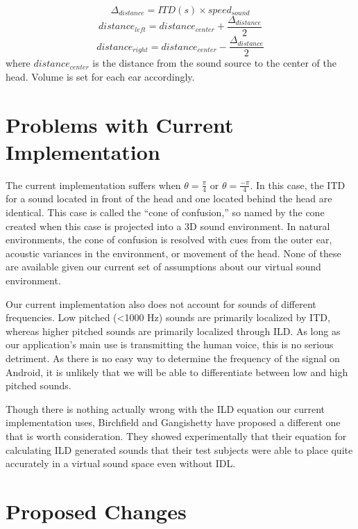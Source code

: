 \documentclass[12pt, letterpaper, draft]{article}
\begin{document}
\begin{equation}
\Delta_{distance} = ITD(s) \times speed_{sound}
\end{equation}
\begin{equation}
distance_{left} = distance_{center} + \frac{\Delta_{distance}}{2}
\end{equation}
\begin{equation}
distance_{right} = distance_{center} - \frac{\Delta_{distance}}{2}
\end{equation}
where $distance_{center}$ is the distance from the sound source to the
center of the head. Volume is set for each ear accordingly.

\section*{Problems with Current Implementation}

The current implementation suffers when $\theta = \frac{\pi}{4}$ or
$\theta = \frac{-\pi}{4}$. In this case, the ITD for a sound located
in front of the head and one located behind the head are identical.
This case is called the ``cone of confusion,'' so named by the cone
created when this case is projected into a 3D sound environment. In
natural environments, the cone of confusion is resolved with cues from
the outer ear, acoustic variances in the environment, or movement of
the head. None of these are available given our current set of
assumptions about our virtual sound environment. 

Our current implementation also does not account for sounds of
different frequencies. Low pitched (<1000 Hz) sounds are primarily
localized by ITD, whereas higher pitched sounds are primarily
localized through ILD. As long as our application's main use is
transmitting the human voice, this is no serious detriment. As there
is no easy way to determine the frequency of the signal on Android, it
is unlikely that we will be able to differentiate between low and high
pitched sounds.

Though there is nothing actually wrong with the ILD equation our
current implementation uses, Birchfield and Gangishetty have proposed
a different one that is worth consideration. They showed
experimentally that their equation for calculating ILD generated
sounds that their test subjects were able to place quite accurately in
a virtual sound space even without IDL.

\section*{Proposed Changes}
\end{document}
